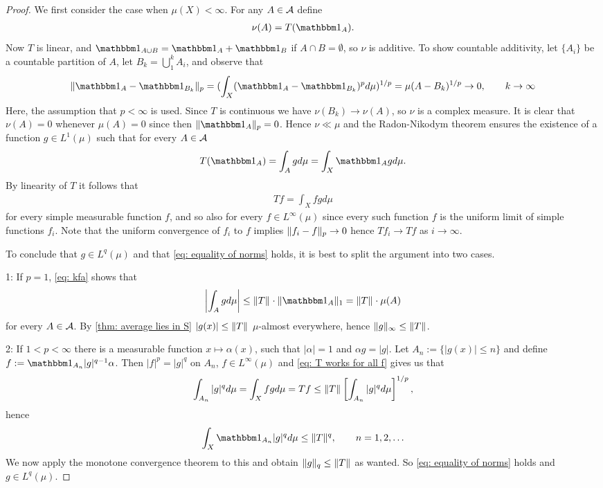 \documentclass[../../main.tex]{subfiles}
\begin{document}
\begin{proof}
We first consider the case when $\mu(X)<\infty$. For any $A\in \m{A}$ define
\begin{align*}
	\nu(A)=T(\ind{A}).
\end{align*}
Now $T$ is linear, and $\ind{A\cup B}=\ind{A}+\ind{B}$ if $A\cap B=\emptyset$, so $\nu$ is additive. To show countable additivity, let $\{A_{i}\}$ be a countable partition of $A$, let $B_{k}=\bigcup_{1}^{k}A_{i}$, and observe that
\begin{align*}
	\norm[p]{\ind{A} -  \ind{B_{k}} }=(\int_{X}(\ind{A} -  \ind{B_{k}})^{p} d\mu)^{1/p}=\mu(A-B_{k})^{1/p}\to 0, \qquad k\to \infty
\end{align*}
Here, the assumption that $p<\infty$ is used. Since $T$ is continuous we have $\nu(B_{k})\to \nu(A)$, so $\nu$ is a complex measure. It is clear that $\nu(A)=0$ whenever $\mu(A)=0$ since then $\norm[p]{\ind{A}}=0$. Hence $\nu \ll \mu$ and the Radon-Nikodym theorem ensures the existence of a function $g\in L^{1}(\mu)$  such that for every $A\in \m{A}$
\begin{align}
	T(\ind{A})=\int_{A}gd\mu=\int_{X}\ind{A}gd\mu. \label{eq: kfa}
\end{align}
By linearity of $T$ it follows that 
\begin{align}
	Tf=\int_{X}fgd\mu \label{eq: T works for all f}
\end{align}
for every simple measurable function $f$, and so also for every $f\in L^{\infty}(\mu)$ since every such function $f$ is the uniform limit of simple functions $f_{i}$. Note that the uniform convergence of $f_{i}$ to $f$ implies $\norm[p]{f_{i}-f}\to 0$ hence $Tf_{i}\to Tf$ as $i\to \infty$.

To conclude that $g\in L^{q}(\mu)$ and that \eqref{eq: equality of norms} holds, it is best to split the argument into two cases.

1: If $p=1$, \eqref{eq: kfa} shows that
\begin{align*}
	\left| \int_{A}gd\mu\right| \le \norm{T}\cdot \norm[1]{\ind{A}}=\norm{T}\cdot\mu(A)
\end{align*}
for every $A\in \m{A}$. By \cref{thm: average lies in S} $|g(x)|\le \norm{T}$ $\mu$-almost everywhere, hence $\norm[\infty]{g}\le \norm{T}$.

2: If $1<p<\infty$ there is a measurable function $x\mapsto \alpha(x)$, such that $|\alpha|=1$ and $\alpha g=|g|$. Let $A_{n}:=\{|g(x)|\le n\}$ and define $f:=\ind{A_{n}}|g|^{q-1}\alpha$. Then $|f|^{p}=|g|^{q}$ on $A_{n}$, $f\in L^{\infty}(\mu)$ and \eqref{eq: T works for all f} gives us that
\begin{align*}
	\int_{A_{n}}|g|^{q}d\mu=\int_{X}fgd\mu=Tf\le \norm{T}\left[ \int_{A_{n}}|g|^{q}d\mu \right]^{1/p},
\end{align*}
hence
\begin{align*}
	\int_{X}\ind{A_{n}}|g|^{q}d\mu \le \norm{T}^{q}, \qquad n=1,2, \dots
\end{align*}
We now apply the monotone convergence theorem to this and obtain $\norm[q]{g}\le \norm{T}$ as wanted. So \eqref{eq: equality of norms} holds and $g\in L^{q}(\mu)$.


\end{proof}
\end{document}
